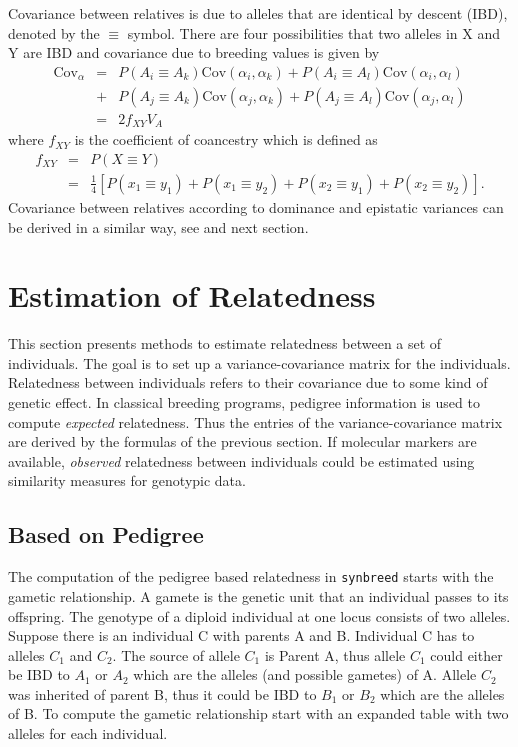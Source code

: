 \documentclass[a4paper,11pt]{article}
\newcommand{\Cov}{\text{Cov}}
\begin{document}
Covariance between relatives is due to alleles that are identical by descent (IBD), denoted by the $\equiv$ symbol. There are four possibilities that two alleles in X and Y are IBD and covariance due to breeding values is given by
\begin{eqnarray*}
\Cov_{\alpha} &=& P(A_i \equiv A_k)\Cov(\alpha_i,\alpha_k)+ P(A_i \equiv A_l)\Cov(\alpha_i,\alpha_l)\\
&+& P(A_j \equiv A_k)\Cov(\alpha_j,\alpha_k) + P(A_j \equiv A_l)\Cov(\alpha_j,\alpha_l) \\
&=& 2f_{XY}V_A
\end{eqnarray*}
where $f_{XY}$ is the coefficient of coancestry \citep{Wright1922} which is defined as
\begin{eqnarray}
f_{XY} &=& P(X \equiv Y) \nonumber \\
&=& \frac{1}{4}\left[ P(x_1 \equiv y_1) + P(x_1 \equiv y_2) + P(x_2 \equiv y_1) + P(x_2 \equiv y_2)\right].
\end{eqnarray}
Covariance between relatives according to dominance and epistatic variances can be derived in a similar way, see \citet{Bernardo2002} and next section. 
 



  

\section{Estimation of Relatedness}\label{sec:RelationshipMatrices}  

This section presents methods to estimate relatedness between a set of individuals. The goal is to set up a variance-covariance matrix for the individuals. Relatedness between individuals refers to their covariance due to some kind of genetic effect.
In classical breeding programs, pedigree information is used to compute \textit{expected} relatedness. Thus the entries of the variance-covariance matrix are derived by the formulas of the previous section.   If molecular markers are available, \textit{observed} relatedness between individuals could be estimated using similarity measures for genotypic data.

\subsection{Based on Pedigree}

The computation of the pedigree based relatedness in \texttt{synbreed} starts with the gametic relationship. A gamete is the genetic unit that an individual passes to its offspring. The genotype of a diploid individual at one locus consists of two alleles. 
Suppose there is an individual C with parents A and B. Individual C has to alleles $C_1$ and $C_2$. The source of allele $C_1$ is Parent A, thus allele $C_1$ could either be IBD to $A_1$ or $A_2$ which are the alleles (and possible gametes) of A. Allele $C_2$ was inherited of parent B, thus it could be IBD to $B_1$ or $B_2$ which are the alleles of B. 
To compute the gametic relationship start with an expanded table with two alleles for each individual. 
 
\end{document}
